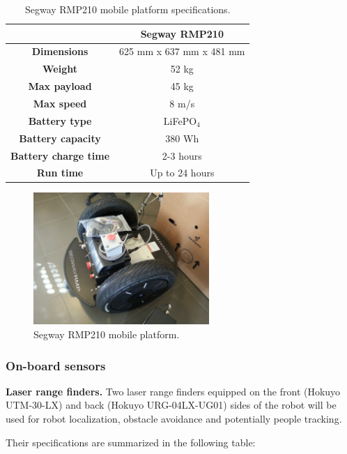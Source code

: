 \begin{table}[h]
\begin{center}
\begin{tabular}{|c|c|}
\hline 
& \bf{Segway RMP210}\\
\hline \bf{Dimensions } & 625 mm x 637 mm x 481 mm \\
\hline \bf{ Weight } & 52 kg \\
\hline \bf{ Max payload } & 45 kg \\
\hline \bf{ Max speed } & 8 m/s \\
\hline \bf{ Battery type } & LiFePO$_4$ \\
\hline \bf{ Battery capacity } & 380 Wh \\
\hline \bf{ Battery charge time } & 2-3 hours \\
\hline \bf{ Run time } & Up to 24 hours \\
\hline
\end{tabular}
\end{center}
\caption{Segway RMP210 mobile platform specifications.}
\end{table}

\begin{figure}[h!]
\begin{center}
\includegraphics[height=5cm]{fig/segway_rmp210.jpg}
\end{center}
\caption{Segway RMP210 mobile platform.}
\label{fig:segway}
\end{figure}

\subsubsection{On-board sensors}

{\bf Laser range finders.} Two laser range finders equipped on the
front (Hokuyo UTM-30-LX) and back (Hokuyo URG-04LX-UG01) sides of the
robot will be used for robot localization, obstacle avoidance and
potentially people tracking.

Their specifications are summarized in the following table:

